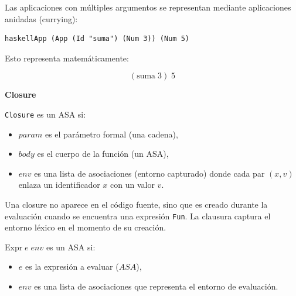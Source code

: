 \documentclass[a4paper,12pt]{article}
\begin{document}
\begin{tcolorbox}[title=Correción:ASA de  LAMBDAE    MÓDULO A3, breakable]
\begin{prooftree}
\end{prooftree}

\medskip
 
Las aplicaciones con m\'ultiples argumentos se representan mediante aplicaciones anidadas (currying):

\begin{verbatim}
haskellApp (App (Id "suma") (Num 3)) (Num 5)
\end{verbatim}

Esto representa matem\'aticamente:

\[
(\text{suma}\; 3)\; 5
\]

\textbf{Closure}

\texttt{Closure}\; \; \;  es un ASA si:

\begin{itemize}
    \item \(\mathit{param}\) es el par\'ametro formal (una cadena),
    \item \(\mathit{body}\) es el cuerpo de la funci\'on (un ASA),
    \item \(\mathit{env}\) es una lista de asociaciones (entorno capturado) donde cada par \((x, v)\) enlaza un identificador \(x\) con un valor \(v\).
\end{itemize}


\begin{prooftree}
\end{prooftree}

Una closure no aparece en el c\'odigo fuente, sino que es creado durante la evaluaci\'on cuando se encuentra una expresi\'on \texttt{Fun}. La clausura captura el entorno l\'exico en el momento de su creaci\'on.




\begin{prooftree}
\end{prooftree}

\(\text{Expr}\; e\; env\) es un ASA si:

\begin{itemize}
    \item \(e\) es la expresi\'on a evaluar (\(ASA\)),
    \item \(env\) es una lista de asociaciones que representa el entorno de evaluaci\'on.
\end{itemize}


\end{tcolorbox}
\end{document}

